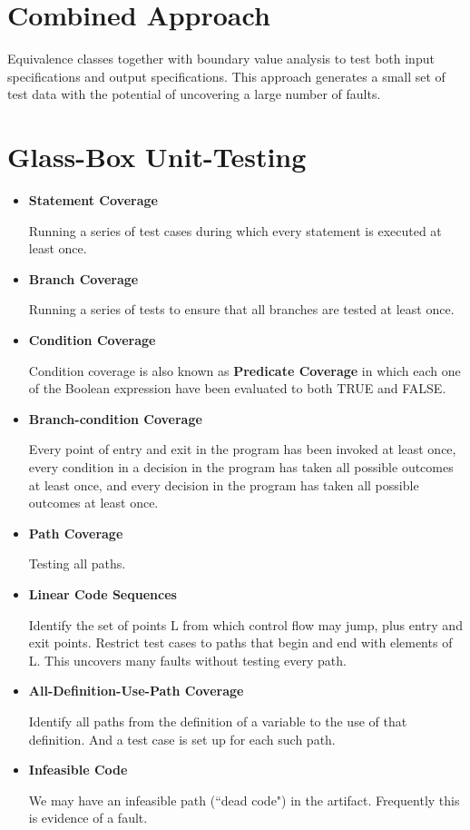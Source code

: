 \documentclass[11pt]{article}
\begin{document}
\section*{Combined Approach}

Equivalence classes together with boundary value analysis to test both input specifications and output specifications. This approach generates a small set of test data with the potential of uncovering a large number of faults.

\section*{Glass-Box Unit-Testing}

\begin{itemize}

	\item \textbf{Statement Coverage}
	
	Running a series of test cases during which every statement is executed at least once.
	
	\item \textbf{Branch Coverage}
	
	Running a series of tests to ensure that all branches are tested at least once.
	
	\item \textbf{Condition Coverage}
	
	Condition coverage is also known as \textbf{Predicate Coverage} in which each one of the Boolean expression have been evaluated to both TRUE and FALSE.
	
	\item \textbf{Branch-condition Coverage}
	
	Every point of entry and exit in the program has been invoked at least once, every condition in a decision in the program has taken all possible outcomes at least once, and every decision in the program has taken all possible outcomes at least once.
	
	\item \textbf{Path Coverage}
	
	Testing all paths.
	
	\item \textbf{Linear Code Sequences}
	
	Identify the set of points L from which control flow may jump, plus entry and exit points. Restrict test cases to paths that begin and end with elements of L. This uncovers many faults without testing every path.
	
	\item \textbf{All-Definition-Use-Path Coverage}
	
	Identify all paths from the definition of a variable to the use of that definition. And a test case is set up for each such path.
	
	\item \textbf{Infeasible Code}
	
	We may have an infeasible path (``dead code") in the artifact. Frequently this is evidence of a fault.

\end{itemize}
\end{document}
